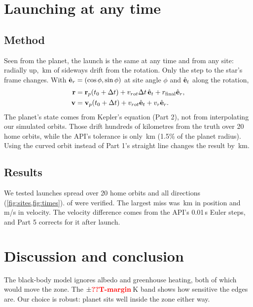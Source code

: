 \documentclass[aps,prd,twocolumn,nofootinbib,floatfix,superscriptaddress]{revtex4-2}
\begin{document}
\section{Launching at any time}\label{sec:launch}
\subsection{Method}
Seen from the planet, the launch is the same at any time and from any site: radially up, \,km of sideways drift from the rotation.
Only the step to the star's frame changes.
With $\hat{\mathbf{e}}_r=(\cos\phi,\sin\phi)$ at site angle $\phi$ and $\hat{\mathbf{e}}_t$ along the rotation,
\begin{align}
  \mathbf{r} &= \mathbf{r}_p(t_0+\Delta t) + v_{rot}\Delta t\,\hat{\mathbf{e}}_t + r_{\rm final}\hat{\mathbf{e}}_r,\\
  \mathbf{v} &= \mathbf{v}_p(t_0+\Delta t) + v_{rot}\hat{\mathbf{e}}_t + v_r\hat{\mathbf{e}}_r.
\end{align}
The planet's state comes from Kepler's equation (Part 2), not from interpolating our simulated orbits.
Those drift hundreds of kilometres from the truth over 20 home orbits, while the API's tolerance is only \,km (1.5\% of the planet radius).
Using the curved orbit instead of Part 1's straight line changes the result by \,km.

\subsection{Results}
We tested  launches spread over 20 home orbits and all directions (\cref{fig:sites,fig:times}).
 of  were verified.
The largest miss was \,km in position and \,m/s in velocity.
The velocity difference comes from the API's 0.01\,s Euler steps, and Part 5 corrects for it after launch.


\section{Discussion and conclusion}
The black-body model ignores albedo and greenhouse heating, both of which would move the zone.
The $\pm\val{T-margin}$\,K band shows how sensitive the edges are.
Our choice is robust: planet  sits well inside the zone either way.
\end{document}
